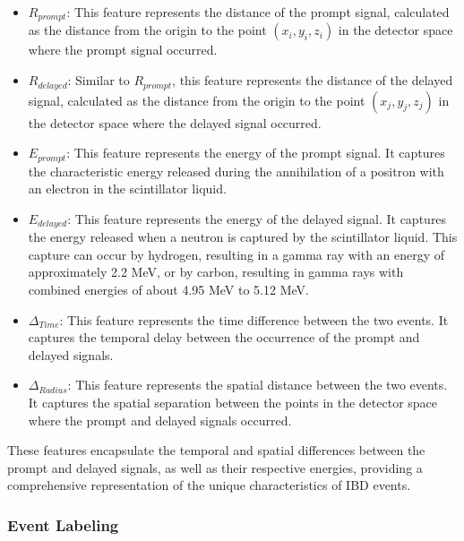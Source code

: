\begin{itemize}
	 
	\item \textbf{$R_{prompt}$}: This feature represents the distance of the prompt signal, calculated as the distance from the origin to the point $(x_i, y_i, z_i)$ in the detector space where the prompt signal occurred.	
	
	\item $R_{delayed}$: Similar to $R_{prompt}$, this feature represents the distance of the delayed signal, calculated as the distance from the origin to the point $(x_j, y_j, z_j)$ in the detector space where the delayed signal occurred.

	\item \textbf{$E_{prompt}$}: This feature represents the energy of the prompt signal. It captures the characteristic energy released during the annihilation of a positron with an electron in the scintillator liquid.

	\item \textbf{$E_{delayed}$}: This feature represents the energy of the delayed signal. It captures the energy released when a neutron is captured by the scintillator liquid. This capture can occur by hydrogen, resulting in a gamma ray with an energy of approximately 2.2 MeV, or by carbon, resulting in gamma rays with combined energies of about 4.95 MeV to 5.12 MeV.

	\item \textbf{$\Delta_{Time}$}: This feature represents the time difference between the two events. It captures the temporal delay between the occurrence of the prompt and delayed signals.

	\item \textbf{$\Delta_{Radius}$}: This feature represents the spatial distance between the two events. It captures the spatial separation between the points in the detector space where the prompt and delayed signals occurred.

\end{itemize}
These features encapsulate the temporal and spatial differences between the prompt and delayed signals, as well as their respective energies, providing a comprehensive representation of the unique characteristics of IBD events.


\subsubsection*{Event Labeling}

